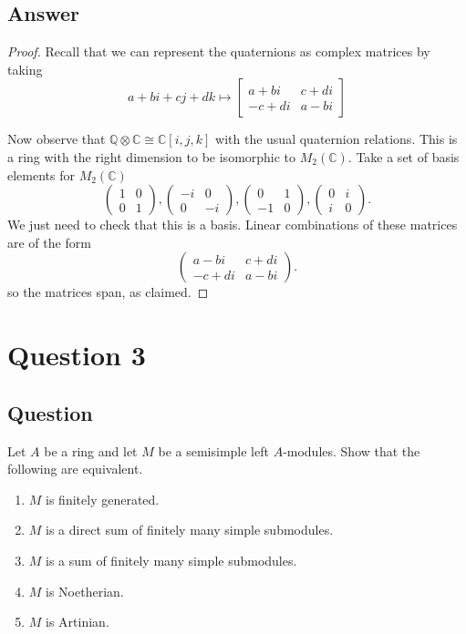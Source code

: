 \documentclass[11pt]{article}
\begin{document}
\subsection{Answer}
\begin{proof}

Recall that we can represent the quaternions as complex matrices by taking
\[a+bi+cj+dk \mapsto \left[ \begin{array}{cc} a+bi & c+di \\ - c+di & a-bi \end{array}\right]\]

Now observe that $\mathbb{Q} \otimes \mathbb{C} \cong \mathbb{C}[i,j,k]$ with the usual quaternion relations. This is a ring with the right dimension to be isomorphic to $M_2(\mathbb{C})$. Take a set of basis elements for $M_2(\mathbb{C})$
\[\left(\begin{array}{cc} 1 & 0 \\0 & 1\end{array} \right) ,\left(\begin{array}{cc} -i & 0 \\0 & -i\end{array} \right) ,\left(\begin{array}{cc} 0& 1 \\-1 & 0\end{array} \right) ,\left(\begin{array}{cc} 0 & i \\i & 0\end{array} \right) .\]
We just need to check that this is a basis. Linear combinations of these matrices are of the form
\[\left( \begin{array}{cc} a -b i & c + d i \\ -c+ d i & a -b i   \end{array} \right).\]
so the matrices span, as claimed.\end{proof}

\section{Question 3}
\subsection{Question}
Let $A$ be a ring and let $M$ be a semisimple left $A$-modules. Show that the following are equivalent.
\begin{enumerate}
\item $M$ is finitely generated.
\item $M$ is a direct sum of finitely many simple submodules.
\item $M$ is a sum of finitely many simple submodules.
\item $M$ is Noetherian.
\item $M$ is Artinian.
\end{enumerate}
\end{document}
